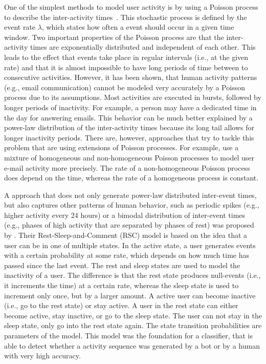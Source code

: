 One of the simplest methods to model user activity is by using a Poisson process to describe the inter-activity times~\cite{Masuda2016, Vazquez2006}.
This stochastic process is defined by the event rate \( \lambda \), which states how often a event should occur in a given time window.
Two important properties of the Poisson process are that the inter-activity times are exponentially distributed and independent of each other.
This leads to the effect that events take place in regular intervals (i.e., at the given rate) and that it is almost impossible to have long periods of time between to consecutive activities.
However, it has been shown, that human activity patterns (e.g., email communication) cannot be modeled very accurately by a Poisson process due to its assumptions.
Most activities are executed in bursts, followed by longer periods of inactivity.
For example, a person may have a dedicated time in the day for answering emails.
This behavior can be much better explained by a power-law distribution of the inter-activity times because its long tail allows for longer inactivity periods.
There are, however, approaches that try to tackle this problem that are using extensions of Poisson processes.
For example, \citet{Malmgren2008} use a mixture of homogeneous and non-homogeneous Poisson processes to model user e-mail activity more precisely.
The rate of a non-homogeneous Poisson process does depend on the time, whereas the rate of a homogeneous process is constant.

A approach that does not only generate power-law distributed inter-event times, but also captures other patterns of human behavior, such as periodic spikes (e.g., higher activity every 24 hours) or a bimodal distribution of inter-event times (e.g., phases of high activity that are separated by phases of rest) was proposed by \citet{Costa2015}.
Their Rest-Sleep-and-Comment (RSC) model is based on the idea that a user can be in one of multiple states.
In the active state, a user generates events with a certain probability at some rate, which depends on how much time has passed since the last event.
The rest and sleep states are used to model the inactivity of a user.
The difference is that the rest state produces null-events (i.e., it increments the time) at a certain rate, whereas the sleep state is used to increment only once, but by a larger amount.
A active user can become inactive (i.e., go to the rest state) or stay active.
A user in the rest state can either become active, stay inactive, or go to the sleep state.
The user can not stay in the sleep state, only go into the rest state again.
The state transition probabilities are parameters of the model.
This model was the foundation for a classifier, that is able to detect whether a activity sequence was generated by a bot or by a human with very high accuracy.

